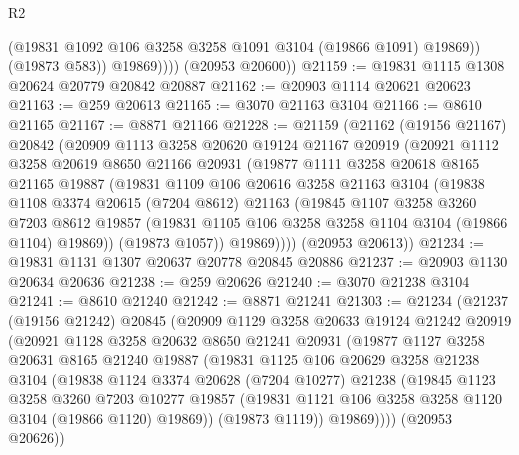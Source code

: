 \begin{lexlean}{R2}
\begin{coremodule}
                  (@19831 @1092 @106 @3258 @3258 @1091 @3104 (@19866 @1091) @19869))
                (@19873 @583))
              @19869))))
      (@20953 @20600))
@21159 := @19831 @1115 @1308 @20624 @20779 @20842 @20887
@21162 := @20903 @1114 @20621 @20623
@21163 := @259 @20613
@21165 := @3070 @21163 @3104
@21166 := @8610 @21165
@21167 := @8871 @21166
@21228 := @21159
    (@21162
      (@19156 @21167)
      @20842
      (@20909
        @1113
        @3258
        @20620
        @19124
        @21167
        @20919
        (@20921
          @1112
          @3258
          @20619
          @8650
          @21166
          @20931
          (@19877
            @1111
            @3258
            @20618
            @8165
            @21165
            @19887
            (@19831
              @1109
              @106
              @20616
              @3258
              @21163
              @3104
              (@19838
                @1108
                @3374
                @20615
                (@7204 @8612)
                @21163
                (@19845
                  @1107
                  @3258
                  @3260
                  @7203
                  @8612
                  @19857
                  (@19831 @1105 @106 @3258 @3258 @1104 @3104 (@19866 @1104) @19869))
                (@19873 @1057))
              @19869))))
      (@20953 @20613))
@21234 := @19831 @1131 @1307 @20637 @20778 @20845 @20886
@21237 := @20903 @1130 @20634 @20636
@21238 := @259 @20626
@21240 := @3070 @21238 @3104
@21241 := @8610 @21240
@21242 := @8871 @21241
@21303 := @21234
    (@21237
      (@19156 @21242)
      @20845
      (@20909
        @1129
        @3258
        @20633
        @19124
        @21242
        @20919
        (@20921
          @1128
          @3258
          @20632
          @8650
          @21241
          @20931
          (@19877
            @1127
            @3258
            @20631
            @8165
            @21240
            @19887
            (@19831
              @1125
              @106
              @20629
              @3258
              @21238
              @3104
              (@19838
                @1124
                @3374
                @20628
                (@7204 @10277)
                @21238
                (@19845
                  @1123
                  @3258
                  @3260
                  @7203
                  @10277
                  @19857
                  (@19831 @1121 @106 @3258 @3258 @1120 @3104 (@19866 @1120) @19869))
                (@19873 @1119))
              @19869))))
      (@20953 @20626))

\end{coremodule}
\end{lexlean}
